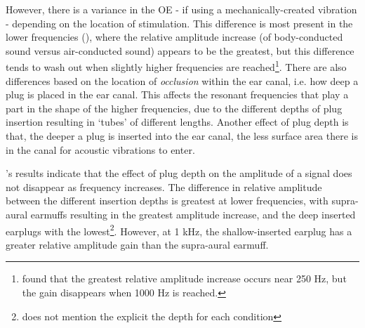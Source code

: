 \documentclass[dissertation,copyright]{uathesis}
\begin{document}
However, there is a variance in the OE - if using a mechanically-created vibration - depending on the location of stimulation.  This difference is most present in the lower frequencies (\cite{dean:00}), where the relative amplitude increase (of body-conducted sound versus air-conducted sound) appears to be the greatest, but this difference tends to wash out when slightly higher frequencies are reached\footnote{\cite{dean:00} found that the greatest relative amplitude increase occurs near 250 Hz, but the gain disappears when 1000 Hz is reached.}.  There are also differences based on the location of \textit{occlusion} within the ear canal, i.e. how deep a plug is placed in the ear canal.  This affects the resonant frequencies that play a part in the shape of the higher frequencies, due to the different depths of plug insertion resulting in `tubes' of different lengths.  Another effect of plug depth is that, the deeper a plug is inserted into the ear canal, the less surface area there is in the canal for acoustic vibrations to enter.  

\cite{dean:00}'s results indicate that the effect of plug depth on the amplitude of a signal does not disappear as frequency increases. The difference in relative amplitude between the different insertion depths is greatest at lower frequencies, with supra-aural earmuffs resulting in the greatest amplitude increase, and the deep inserted earplugs with the lowest\footnote{\cite{dean:00} does not mention the explicit the depth for each condition}. 
However, at 1 kHz, the shallow-inserted earplug has a greater relative amplitude gain than the supra-aural earmuff.
\end{document}
